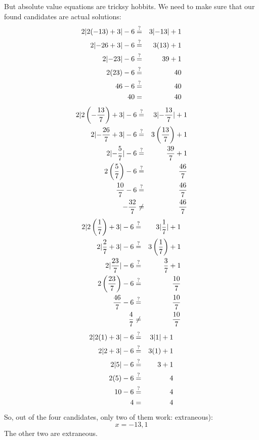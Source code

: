 \documentclass[letterpaper,12pt,fleqn]{article}
\newcommand{\qe}{\overset{?}{=}}
\begin{document}
\begin{enumerate}
  But absolute value equations are tricksy hobbits. We need to make sure that
  our found candidates are actual solutions:
  \begin{eqnarray*}
    2\abs{2(-13)+3}-6 &\qe& 3\abs{-13}+1 \\
    2\abs{-26+3}-6 &\qe& 3(13)+1 \\
    2\abs{-23}-6 &\qe& 39+1 \\
    2(23)-6 &\qe& 40 \\
    46-6 &\qe& 40 \\
    40 &=& 40 \\
  \end{eqnarray*}
  \begin{eqnarray*}
    2\abs{2\left(-\frac{13}{7}\right)+3}-6 &\qe& 3\abs{-\frac{13}{7}}+1 \\
    2\abs{-\frac{26}{7}+3}-6 &\qe& 3\left(\frac{13}{7}\right)+1 \\
    2\abs{-\frac{5}{7}}-6 &\qe& \frac{39}{7}+1 \\
    2\left(\frac{5}{7}\right)-6 &\qe& \frac{46}{7} \\
    \frac{10}{7}-6 &\qe& \frac{46}{7} \\
    -\frac{32}{7} &\ne& \frac{46}{7} \\
  \end{eqnarray*}
  \begin{eqnarray*}
    2\abs{2\left(\frac{1}{7}\right)+3}-6 &\qe& 3\abs{\frac{1}{7}}+1 \\
    2\abs{\frac{2}{7}+3}-6 &\qe& 3\left(\frac{1}{7}\right)+1 \\
    2\abs{\frac{23}{7}}-6 &\qe& \frac{3}{7}+1 \\
    2\left(\frac{23}{7}\right)-6 &\qe& \frac{10}{7} \\
    \frac{46}{7}-6 &\qe& \frac{10}{7} \\
    \frac{4}{7} &\ne& \frac{10}{7} \\
  \end{eqnarray*}
  \begin{eqnarray*}
    2\abs{2(1)+3}-6 &\qe& 3\abs{1}+1 \\
    2\abs{2+3}-6 &\qe& 3(1)+1 \\
    2\abs{5}-6 &\qe& 3+1 \\
    2(5)-6 &\qe& 4 \\
    10-6 &\qe& 4 \\
    4 &=& 4 \\
  \end{eqnarray*}
  So, out of the four candidates, only two of them work:
  extraneous):
  \[x=-13,1\]
  The other two are extraneous.


\end{enumerate}
\end{document}
